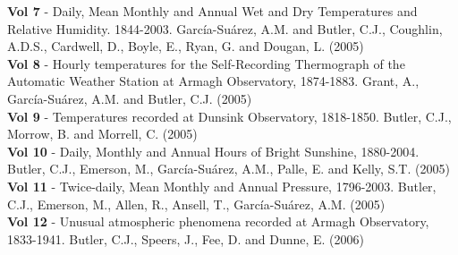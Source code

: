 \documentclass[12pt, epsfig, graphics, rotating, epsf,tifff]{article}
\begin{document}
\noindent
{\bf Vol 7} - Daily, Mean Monthly and Annual Wet and Dry Temperatures and
Relative Humidity. 1844-2003. Garc\'{i}a-Su\'{a}rez, A.M. and Butler, C.J., Coughlin,
A.D.S., Cardwell, D., Boyle, E., Ryan, G. and Dougan, L. (2005)\\

\noindent
{\bf Vol 8} - Hourly temperatures for the Self-Recording Thermograph of the Automatic
Weather Station at Armagh Observatory, 1874-1883. Grant, A., Garc\'{i}a-Su\'{a}rez,
A.M. and Butler, C.J. (2005)\\

\noindent
{\bf Vol 9} - Temperatures recorded at Dunsink Observatory, 1818-1850. Butler, C.J.,
Morrow, B. and Morrell, C. (2005)\\

\noindent
{\bf Vol 10} - Daily, Monthly and Annual Hours of Bright Sunshine, 1880-2004. Butler,
C.J., Emerson, M., Garc\'{i}a-Su\'{a}rez, A.M., Palle, E. and Kelly, S.T. (2005) \\

\noindent
{\bf Vol 11} - Twice-daily, Mean Monthly and Annual Pressure, 1796-2003. Butler,
C.J., Emerson, M., Allen, R., Ansell, T., Garc\'{i}a-Su\'{a}rez, A.M. (2005)\\

\noindent
{\bf Vol 12} - Unusual atmospheric phenomena recorded at Armagh Observatory,
1833-1941. Butler, C.J., Speers, J., Fee, D. and Dunne, E. (2006)\\
\end{document}
